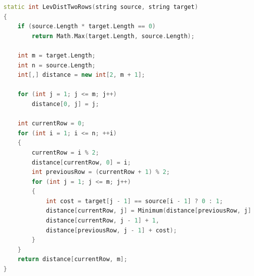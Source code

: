 \documentclass{report}
\begin{document}
\newpage
\begin{lstlisting}[label=code3,caption=Функция для нерекурсивного нахождения расстояния Левенштейна с кэшем в виде двух строк матрицы,language=C++]
static int LevDistTwoRows(string source, string target)
{
	if (source.Length * target.Length == 0)
		return Math.Max(target.Length, source.Length);
	
	int m = target.Length;
	int n = source.Length;
	int[,] distance = new int[2, m + 1];
	
	for (int j = 1; j <= m; j++) 
		distance[0, j] = j;
	
	int currentRow = 0;
	for (int i = 1; i <= n; ++i)
	{
		currentRow = i % 2;
		distance[currentRow, 0] = i;
		int previousRow = (currentRow + 1) % 2;
		for (int j = 1; j <= m; j++)
		{
			int cost = target[j - 1] == source[i - 1] ? 0 : 1;
			distance[currentRow, j] = Minimum(distance[previousRow, j] + 1,
			distance[currentRow, j - 1] + 1,
			distance[previousRow, j - 1] + cost);
		}
	}
	return distance[currentRow, m];
}	
\end{lstlisting}
\end{document}
